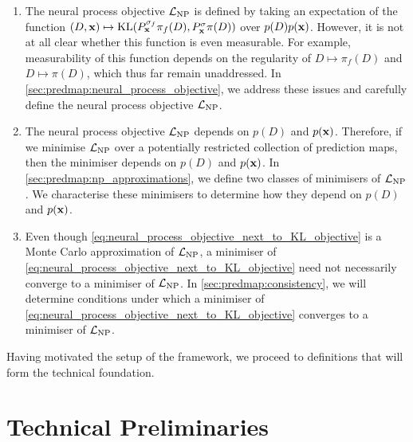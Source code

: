 \documentclass[12pt, twoside]{report}
\begin{document}
\begin{enumerate}
    \item
        The neural process objective $\L\ss{NP}$ is defined by taking an expectation of the function
        $(D, \mathbf{x}) \mapsto \operatorname{KL}(P^{\sigma_f}_{\mathbf{x}} \pi_f(D), P^{\sigma}_{\mathbf{x}} \pi(D))$
        over $p(D)p(\mathbf{x})$.
        However, it is not at all clear whether this function is even measurable.
        For example, measurability of this function depends on the regularity of $D \mapsto \pi_f(D)$ and $D \mapsto \pi(D)$, which thus far remain unaddressed.
        In \cref{sec:predmap:neural_process_objective},
        we address these issues and carefully define the neural process objective $\L\ss{NP}$.
    \item 
        The neural process objective $\L\ss{NP}$ depends on $p(D)$ and $p(\mathbf{x})$.
        Therefore, if we minimise $\L\ss{NP}$ over a potentially restricted collection of prediction maps,
        then the minimiser depends on $p(D)$ and $p(\mathbf{x})$. %
        In \cref{sec:predmap:np_approximations}, we define two classes of minimisers of $\L\ss{NP}$.
        We characterise these minimisers to determine how they depend on $p(D)$ and $p(\mathbf{x})$.
    \item 
        Even though \eqref{eq:neural_process_objective_next_to_KL_objective} is a Monte Carlo approximation of $\L\ss{NP}$, a minimiser of \eqref{eq:neural_process_objective_next_to_KL_objective} need not necessarily converge to a minimiser of $\L\ss{NP}$.
        In \cref{sec:predmap:consistency}, we will determine conditions under which a minimiser of \eqref{eq:neural_process_objective_next_to_KL_objective} converges to a minimiser of $\L\ss{NP}$.
\end{enumerate}

Having motivated the setup of the framework, we proceed to definitions that will form the technical foundation.

\section{Technical Preliminaries}
\label{sec:predmap:prelims}
\end{document}
